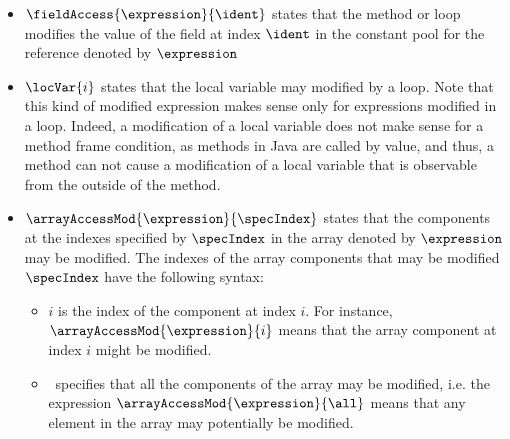 \begin{itemize}
      \item  $ \fieldAccess{\expression}{\ident} $ states that the method or loop modifies the value of the field at index $\ident$ 
             in the constant pool for the reference denoted by  $\expression$ 
      \item $\locVar{i}$ states that the local variable may modified by a loop. Note that this kind of modified
            expression makes sense only for expressions modified in a loop.
            Indeed, a modification of a local variable does not make sense for a method frame condition, 
            as methods in Java are called by value, and
            thus, a method can not cause a modification of a local variable that is observable from the outside of the method.
            
      \item  $\arrayAccessMod{\expression}{\specIndex}$ states that the components at the indexes specified by $\specIndex$ in
            the array denoted by $\expression$ may be modified. The indexes of the array components that may be modified $\specIndex$
            have the following syntax:
            \begin{itemize}
                  \item $i$ is the index of the component at index $i$. For instance, 
                        $\arrayAccessMod{\expression}{i}$ means that the array component at index $i$ might be modified.
                  \item \all \ specifies that all the components of the array may be modified, i.e. the expression 
                         $\arrayAccessMod{\expression}{\all}$ means that any element in the array may potentially be modified.
                       

\end{itemize}
\end{itemize}
